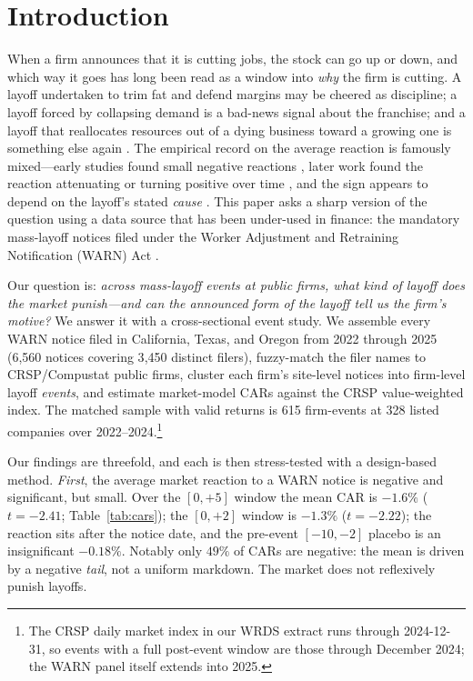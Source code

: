 \documentclass[12pt]{article}
\begin{document}
\newpage
\section{Introduction}
When a firm announces that it is cutting jobs, the stock can go up or down, and
which way it goes has long been read as a window into \emph{why} the firm is
cutting. A layoff undertaken to trim fat and defend margins may be cheered as
discipline; a layoff forced by collapsing demand is a bad-news signal about the
franchise; and a layoff that reallocates resources out of a dying business toward
a growing one is something else again \citep{cascio1993,love2005}. The empirical
record on the average reaction is famously mixed---early studies found small
negative reactions \citep{worrell1991,palmon1997}, later work found the reaction
attenuating or turning positive over time \citep{farber2009}, and the sign
appears to depend on the layoff's stated \emph{cause}
\citep{elayan1998,nixon2004,chen2001}. This paper asks a sharp version of the
question using a data source that has been under-used in finance: the mandatory
mass-layoff notices filed under the Worker Adjustment and Retraining Notification
(WARN) Act \citep{addison1994}.

Our question is: \emph{across mass-layoff events at public firms, what kind of
layoff does the market punish---and can the announced form of the layoff tell us
the firm's motive?} We answer it with a cross-sectional event study. We assemble
every WARN notice filed in California, Texas, and Oregon from 2022 through 2025
(6{,}560 notices covering 3{,}450 distinct filers), fuzzy-match the filer names to
CRSP/Compustat public firms, cluster each firm's site-level notices into
firm-level layoff \emph{events}, and estimate market-model CARs against the CRSP
value-weighted index. The matched sample with valid returns is 615 firm-events at
328 listed companies over 2022--2024.\footnote{The CRSP daily market index in our
WRDS extract runs through 2024-12-31, so events with a full post-event window are
those through December 2024; the WARN panel itself extends into 2025.}

Our findings are threefold, and each is then stress-tested with a design-based
method. \emph{First}, the average market reaction to a WARN notice is negative and
significant, but small. Over the $[0,+5]$ window the mean CAR is $-1.6\%$
($t=-2.41$; Table~\ref{tab:cars}); the $[0,+2]$ window is $-1.3\%$ ($t=-2.22$);
the reaction sits after the notice date, and the pre-event $[-10,-2]$ placebo is
an insignificant $-0.18\%$. Notably only $49\%$ of CARs are negative: the mean is
driven by a negative \emph{tail}, not a uniform markdown. The market does not
reflexively punish layoffs.
\end{document}

